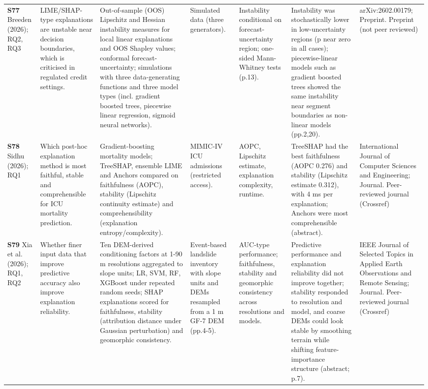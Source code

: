 \begin{longtable}{@{}P{1.55cm}P{2.9cm}P{4.5cm}P{3.2cm}P{3.4cm}P{4.6cm}P{3.6cm}@{}}
\textbf{S77} \cite{S77} Breeden (2026); RQ2, RQ3 & LIME/\allowbreak{}SHAP-type explanations are unstable near decision boundaries, which is criticised in regulated credit settings. & Out-of-sample (OOS) Lipschitz and Hessian instability measures for local linear explanations and OOS Shapley values; conformal forecast-uncertainty; simulations with three data-generating functions and three model types (incl. gradient boosted trees, piecewise linear regression, sigmoid neural networks). & Simulated data (three generators). & Instability conditional on forecast-uncertainty region; one-sided Mann-Whitney tests (p.13). & Instability was stochastically lower in low-uncertainty regions (p near zero in all cases); piecewise-linear models such as gradient boosted trees showed the same instability near segment boundaries as non-linear models (pp.2,20). & arXiv:2602.00179; Preprint. Preprint (not peer reviewed) \\
\textbf{S78} \cite{S78} Sidhu (2026); RQ1 & Which post-hoc explanation method is most faithful, stable and comprehensible for ICU mortality prediction. & Gradient-boosting mortality models; TreeSHAP, ensemble LIME and Anchors compared on faithfulness (AOPC), stability (Lipschitz continuity estimate) and comprehensibility (explanation entropy/\allowbreak{}complexity). & MIMIC-IV ICU admissions (restricted access). & AOPC, Lipschitz estimate, explanation complexity, runtime. & TreeSHAP had the best faithfulness (AOPC 0.276) and stability (Lipschitz estimate 0.312), with 4 ms per explanation; Anchors were most comprehensible (abstract). & International Journal of Computer Sciences and Engineering; Journal. Peer-reviewed journal (Crossref) \\
\textbf{S79} \cite{S79} Xia et al. (2026); RQ1, RQ2 & Whether finer input data that improve predictive accuracy also improve explanation reliability. & Ten DEM-derived conditioning factors at 1-90 m resolutions aggregated to slope units; LR, SVM, RF, XGBoost under repeated random seeds; SHAP explanations scored for faithfulness, stability (attribution distance under Gaussian perturbation) and geomorphic consistency. & Event-based landslide inventory with slope units and DEMs resampled from a 1 m GF-7 DEM (pp.4-5). & AUC-type performance; faithfulness, stability and geomorphic consistency across resolutions and models. & Predictive performance and explanation reliability did not improve together; stability responded to resolution and model, and coarse DEMs could look stable by smoothing terrain while shifting feature-importance structure (abstract; p.7). & IEEE Journal of Selected Topics in Applied Earth Observations and Remote Sensing; Journal. Peer-reviewed journal (Crossref) \\
\end{longtable}
